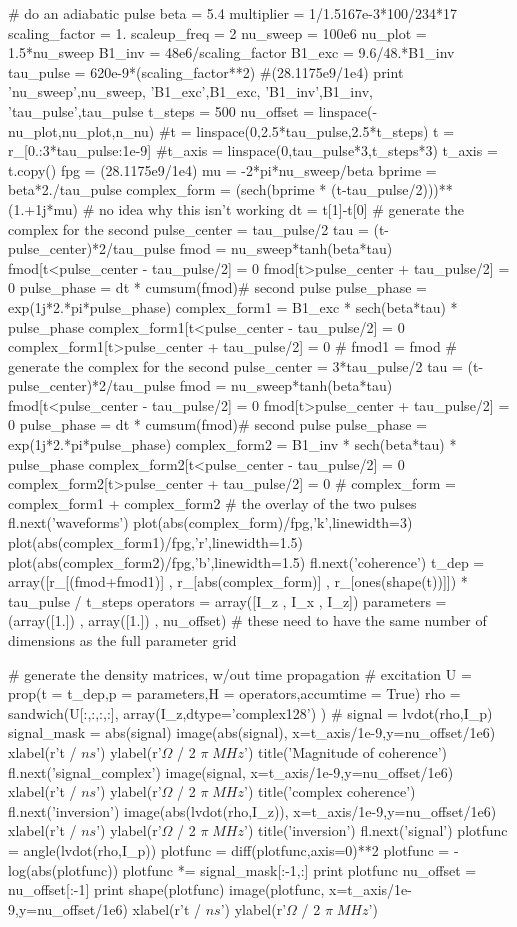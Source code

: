 \begin{python}
# do an adiabatic pulse
beta = 5.4
multiplier = 1/1.5167e-3*100/234*17
scaling_factor = 1.
scaleup_freq = 2
nu_sweep = 100e6
nu_plot = 1.5*nu_sweep
B1_inv = 48e6/scaling_factor
B1_exc = 9.6/48.*B1_inv
tau_pulse = 620e-9*(scaling_factor**2)
#(28.1175e9/1e4)
print 'nu_sweep',nu_sweep, 'B1_exc',B1_exc, 'B1_inv',B1_inv, 'tau_pulse',tau_pulse
t_steps = 500
nu_offset = linspace(-nu_plot,nu_plot,n_nu)
#t = linspace(0,2.5*tau_pulse,2.5*t_steps)
t = r_[0.:3*tau_pulse:1e-9]
#t_axis = linspace(0,tau_pulse*3,t_steps*3)
t_axis = t.copy()
fpg = (28.1175e9/1e4)
mu = -2*pi*nu_sweep/beta
bprime = beta*2./tau_pulse
complex_form = (sech(bprime * (t-tau_pulse/2)))**(1.+1j*mu) # no idea why this isn't working
dt = t[1]-t[0]
#{{{ generate the complex for the second
pulse_center = tau_pulse/2
tau = (t-pulse_center)*2/tau_pulse
fmod = nu_sweep*tanh(beta*tau)
fmod[t<pulse_center - tau_pulse/2] = 0
fmod[t>pulse_center + tau_pulse/2] = 0
pulse_phase = dt * cumsum(fmod)# second pulse
pulse_phase = exp(1j*2.*pi*pulse_phase)
complex_form1 = B1_exc * sech(beta*tau) * pulse_phase
complex_form1[t<pulse_center - tau_pulse/2] = 0
complex_form1[t>pulse_center + tau_pulse/2] = 0
#}}}
fmod1 = fmod
#{{{ generate the complex for the second
pulse_center = 3*tau_pulse/2
tau = (t-pulse_center)*2/tau_pulse
fmod = nu_sweep*tanh(beta*tau)
fmod[t<pulse_center - tau_pulse/2] = 0
fmod[t>pulse_center + tau_pulse/2] = 0
pulse_phase = dt * cumsum(fmod)# second pulse
pulse_phase = exp(1j*2.*pi*pulse_phase)
complex_form2 = B1_inv * sech(beta*tau) * pulse_phase
complex_form2[t<pulse_center - tau_pulse/2] = 0
complex_form2[t>pulse_center + tau_pulse/2] = 0
#}}}
complex_form = complex_form1 + complex_form2 # the overlay of the two pulses
fl.next('waveforms')
plot(abs(complex_form)/fpg,'k',linewidth=3)
plot(abs(complex_form1)/fpg,'r',linewidth=1.5)
plot(abs(complex_form2)/fpg,'b',linewidth=1.5)
fl.next('coherence')
t_dep = array([r_[(fmod+fmod1)] , r_[abs(complex_form)] , r_[ones(shape(t))]]) * tau_pulse / t_steps
operators = array([I_z          , I_x                   , I_z])
parameters = (array([1.])       , array([1.])           , nu_offset) # these need to have the same number of dimensions as the full parameter grid

# generate the density matrices, w/out time propagation
#{{{ excitation
U = prop(t = t_dep,p = parameters,H = operators,accumtime = True)
rho = sandwich(U[:,:,:,:],
	array(I_z,dtype='complex128')
	)
#}}}
signal = lvdot(rho,I_p)
signal_mask = abs(signal)
image(abs(signal),
		x=t_axis/1e-9,y=nu_offset/1e6)
xlabel(r't / $ns$')
ylabel(r'$\Omega$ / 2 $\pi\;MHz$')
title('Magnitude of coherence')
fl.next('signal_complex')
image(signal,
		x=t_axis/1e-9,y=nu_offset/1e6)
xlabel(r't / $ns$')
ylabel(r'$\Omega$ / 2 $\pi\;MHz$')
title('complex coherence')
fl.next('inversion')
image(abs(lvdot(rho,I_z)),
		x=t_axis/1e-9,y=nu_offset/1e6)
xlabel(r't / $ns$')
ylabel(r'$\Omega$ / 2 $\pi\;MHz$')
title('inversion')
fl.next('signal')
plotfunc = angle(lvdot(rho,I_p))
plotfunc = diff(plotfunc,axis=0)**2
plotfunc = -log(abs(plotfunc))
plotfunc *= signal_mask[:-1,:]
print plotfunc
nu_offset = nu_offset[:-1]
print shape(plotfunc)
image(plotfunc,
		x=t_axis/1e-9,y=nu_offset/1e6)
xlabel(r't / $ns$')
ylabel(r'$\Omega$ / 2 $\pi\;MHz$')


\end{python}
